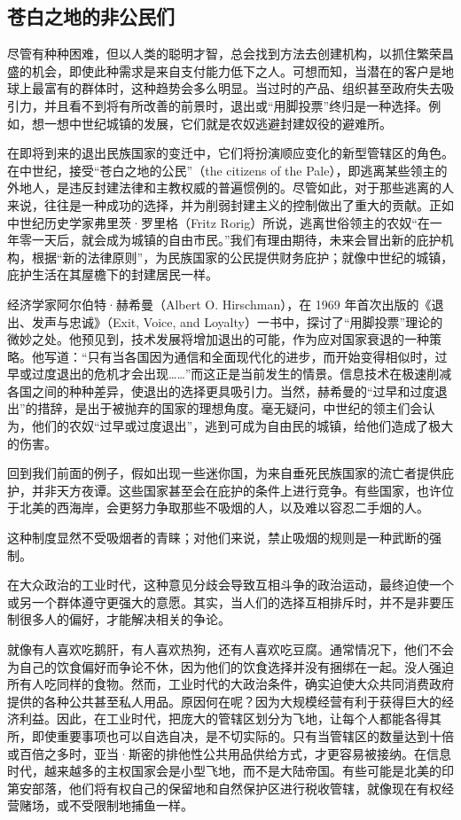 \subsection{苍白之地的非公民们}
尽管有种种困难，但以人类的聪明才智，总会找到方法去创建机构，以抓住繁荣昌盛的机会，即使此种需求是来自支付能力低下之人。可想而知，当潜在的客户是地球上最富有的群体时，这种趋势会多么明显。当过时的产品、组织甚至政府失去吸引力，并且看不到将有所改善的前景时，退出或“用脚投票”终归是一种选择。例如，想一想中世纪城镇的发展，它们就是农奴逃避封建奴役的避难所。

在即将到来的退出民族国家的变迁中，它们将扮演顺应变化的新型管辖区的角色。在中世纪，接受“苍白之地的公民”（the citizens of the Pale），即逃离某些领主的外地人，是违反封建法律和主教权威的普遍惯例的。尽管如此，对于那些逃离的人来说，往往是一种成功的选择，并为削弱封建主义的控制做出了重大的贡献。正如中世纪历史学家弗里茨·罗里格（Fritz Rorig）所说，逃离世俗领主的农奴“在一年零一天后，就会成为城镇的自由市民。”我们有理由期待，未来会冒出新的庇护机构，根据“新的法律原则”，为民族国家的公民提供财务庇护；就像中世纪的城镇，庇护生活在其屋檐下的封建居民一样。

经济学家阿尔伯特·赫希曼（Albert O. Hirschman），在 1969 年首次出版的《退出、发声与忠诚》（Exit, Voice, and Loyalty）一书中，探讨了“用脚投票”理论的微妙之处。他预见到，技术发展将增加退出的可能，作为应对国家衰退的一种策略。他写道：“只有当各国因为通信和全面现代化的进步，而开始变得相似时，过早或过度退出的危机才会出现……”而这正是当前发生的情景。信息技术在极速削减各国之间的种种差异，使退出的选择更具吸引力。当然，赫希曼的“过早和过度退出”的措辞，是出于被抛弃的国家的理想角度。毫无疑问，中世纪的领主们会认为，他们的农奴“过早或过度退出”，逃到可成为自由民的城镇，给他们造成了极大的伤害。

回到我们前面的例子，假如出现一些迷你国，为来自垂死民族国家的流亡者提供庇护，并非天方夜谭。这些国家甚至会在庇护的条件上进行竞争。有些国家，也许位于北美的西海岸，会更努力争取那些不吸烟的人，以及难以容忍二手烟的人。

这种制度显然不受吸烟者的青睐；对他们来说，禁止吸烟的规则是一种武断的强制。

在大众政治的工业时代，这种意见分歧会导致互相斗争的政治运动，最终迫使一个或另一个群体遵守更强大的意愿。其实，当人们的选择互相排斥时，并不是非要压制很多人的偏好，才能解决相关的争论。

就像有人喜欢吃鹅肝，有人喜欢热狗，还有人喜欢吃豆腐。通常情况下，他们不会为自己的饮食偏好而争论不休，因为他们的饮食选择并没有捆绑在一起。没人强迫所有人吃同样的食物。然而，工业时代的大政治条件，确实迫使大众共同消费政府提供的各种公共甚至私人用品。原因何在呢？因为大规模经营有利于获得巨大的经济利益。因此，在工业时代，把庞大的管辖区划分为飞地，让每个人都能各得其所，即使重要事项也可以自选自决，是不切实际的。只有当管辖区的数量达到十倍或百倍之多时，亚当·斯密的排他性公共用品供给方式，才更容易被接纳。在信息时代，越来越多的主权国家会是小型飞地，而不是大陆帝国。有些可能是北美的印第安部落，他们将有权自己的保留地和自然保护区进行税收管辖，就像现在有权经营赌场，或不受限制地捕鱼一样。

